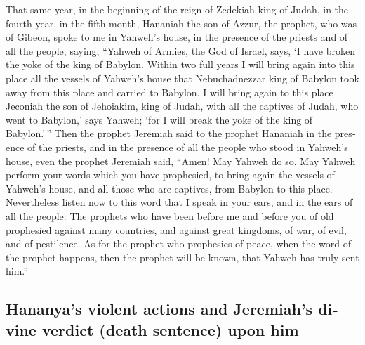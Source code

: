 \begin{paracol}{2}
\begin{otherlanguage}{english}
 That same year, in the beginning of the reign of Zedekiah
king of Judah, in the fourth year, in the fifth month, Hananiah the son
of Azzur, the prophet, who was of Gibeon, spoke to me in Yahweh's house,
in the presence of the priests and of all the people, saying,
 ``Yahweh of Armies, the God of Israel, says, `I have
broken the yoke of the king of Babylon.  Within two full
years I will bring again into this place all the vessels of Yahweh's
house that Nebuchadnezzar king of Babylon took away from this place and
carried to Babylon.  I will bring again to this place
Jeconiah the son of Jehoiakim, king of Judah, with all the captives of
Judah, who went to Babylon,' says Yahweh; `for I will break the yoke of
the king of Babylon.'\,''  Then the prophet Jeremiah said
to the prophet Hananiah in the presence of the priests, and in the
presence of all the people who stood in Yahweh's house, 
even the prophet Jeremiah said, ``Amen! May Yahweh do so. May Yahweh
perform your words which you have prophesied, to bring again the vessels
of Yahweh's house, and all those who are captives, from Babylon to this
place.  Nevertheless listen now to this word that I speak
in your ears, and in the ears of all the people:  The
prophets who have been before me and before you of old prophesied
against many countries, and against great kingdoms, of war, of evil, and
of pestilence.  As for the prophet who prophesies of
peace, when the word of the prophet happens, then the prophet will be
known, that Yahweh has truly sent him.''

\hypertarget{hananyas-violent-actions-and-jeremiahs-divine-verdict-death-sentence-upon-him}{%
\subsection{Hananya's violent actions and Jeremiah's divine verdict
(death sentence) upon
him}\label{hananyas-violent-actions-and-jeremiahs-divine-verdict-death-sentence-upon-him}}


\end{otherlanguage}
\end{paracol}
